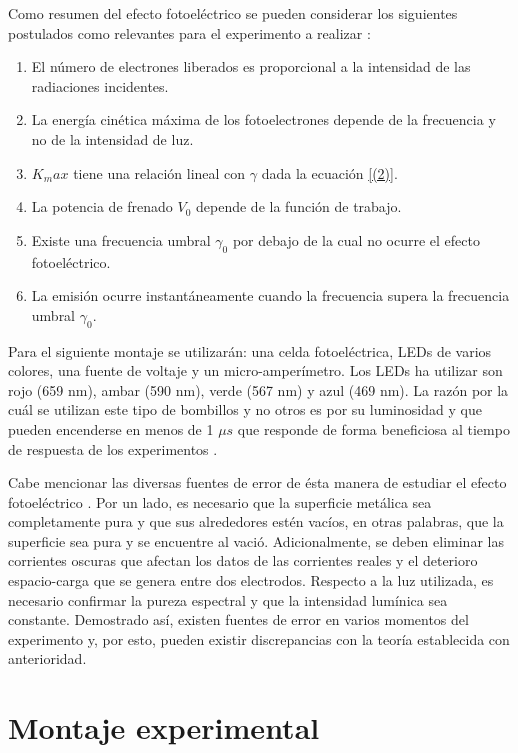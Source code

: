 \documentclass[%
 reprint,
 amsmath,amssymb,
 aps,
]{revtex4-1}
\begin{document}
Como resumen del efecto fotoeléctrico se pueden considerar los siguientes postulados como relevantes para el experimento a realizar \cite{Einstein}:

\begin{enumerate}
    \item El número de electrones liberados es proporcional a la intensidad de las radiaciones incidentes.
    \item La energía cinética máxima de los fotoelectrones depende de la frecuencia y no de la intensidad de luz.
    \item $K_max$ tiene una relación lineal con $\gamma$ dada la ecuación \eqref{(2)}.
    \item La potencia de frenado $V_0$ depende de la función de trabajo.
    \item Existe una frecuencia umbral $\gamma_0$ por debajo de la cual no ocurre el efecto fotoeléctrico.
    \item La emisión ocurre instantáneamente cuando la frecuencia supera la frecuencia umbral $\gamma_0$.
 \end{enumerate}

Para el siguiente montaje se utilizarán: una celda fotoeléctrica, LEDs de varios colores, una fuente de voltaje y un micro-amperímetro. Los LEDs ha utilizar son rojo (659 nm), ambar (590 nm), verde (567 nm) y azul (469 nm). La razón por la cuál se utilizan este tipo de bombillos y no otros es por su luminosidad y que pueden encenderse en menos de 1 $\mu s$ que responde de forma beneficiosa al tiempo de respuesta de los experimentos \cite{LEDs}.

Cabe mencionar las diversas fuentes de error de ésta manera de estudiar el efecto fotoeléctrico \cite{Errores_asociados_new_approach}. Por un lado, es necesario que la superficie metálica sea completamente pura y que sus alrededores estén vacíos, en otras palabras, que la superficie sea pura y se encuentre al vació. Adicionalmente, se deben eliminar las corrientes oscuras que afectan los datos de las corrientes reales y el deterioro espacio-carga que se genera entre dos electrodos. Respecto a la luz utilizada, es necesario confirmar la pureza espectral y que la intensidad lumínica sea constante. Demostrado así, existen fuentes de error en varios momentos del experimento y, por esto, pueden existir discrepancias con la teoría establecida con anterioridad.

\section{\label{montaje} Montaje experimental}
\end{document}
